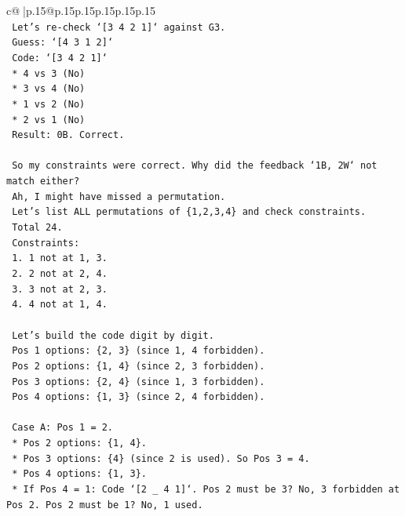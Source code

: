 \documentclass{article}
\begin{document}
{\begin{supertabular}{c@{$\;$}|p{.15\linewidth}@{}p{.15\linewidth}p{.15\linewidth}p{.15\linewidth}p{.15\linewidth}p{.15\linewidth}}
{{{\\ 
\texttt{    Let's re{-}check `{[}3 4 2 1{]}` against G3.} \\
\texttt{    Guess: `{[}4 3 1 2{]}`} \\
\texttt{    Code: `{[}3 4 2 1{]}`} \\
\texttt{    *   4 vs 3 (No)} \\
\texttt{    *   3 vs 4 (No)} \\
\texttt{    *   1 vs 2 (No)} \\
\texttt{    *   2 vs 1 (No)} \\
\texttt{    Result: 0B. Correct.} \\
\\ 
\texttt{    So my constraints were correct. Why did the feedback `1B, 2W` not match either?} \\
\texttt{    Ah, I might have missed a permutation.} \\
\texttt{    Let's list ALL permutations of \{1,2,3,4\} and check constraints.} \\
\texttt{    Total 24.} \\
\texttt{    Constraints:} \\
\texttt{    1. 1 not at 1, 3.} \\
\texttt{    2. 2 not at 2, 4.} \\
\texttt{    3. 3 not at 2, 3.} \\
\texttt{    4. 4 not at 1, 4.} \\
\\ 
\texttt{    Let's build the code digit by digit.} \\
\texttt{    Pos 1 options: \{2, 3\} (since 1, 4 forbidden).} \\
\texttt{    Pos 2 options: \{1, 4\} (since 2, 3 forbidden).} \\
\texttt{    Pos 3 options: \{2, 4\} (since 1, 3 forbidden).} \\
\texttt{    Pos 4 options: \{1, 3\} (since 2, 4 forbidden).} \\
\\ 
\texttt{    Case A: Pos 1 = 2.} \\
\texttt{    *   Pos 2 options: \{1, 4\}.} \\
\texttt{    *   Pos 3 options: \{4\} (since 2 is used). So Pos 3 = 4.} \\
\texttt{    *   Pos 4 options: \{1, 3\}.} \\
\texttt{        *   If Pos 4 = 1: Code `{[}2 \_ 4 1{]}`. Pos 2 must be 3? No, 3 forbidden at Pos 2. Pos 2 must be 1? No, 1 used.} \\
}}}
\end{supertabular}}
\end{document}
